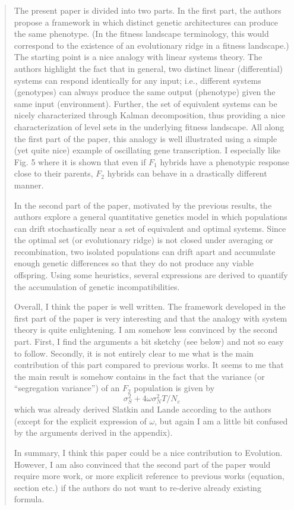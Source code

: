\begin{quote}
The present paper is divided into two parts. In the first part, the authors propose a framework
in which distinct genetic architectures can produce the same phenotype. (In the fitness landscape
terminology, this would correspond to the existence of an evolutionary ridge in a fitness landscape.)
The starting point is a nice analogy with linear systems theory. The authors highlight the fact
that in general, two distinct linear (differential) systems can respond identically for any input; i.e.,
different systems (genotypes) can always produce the same output (phenotype) given the same input
(environment). Further, the set of equivalent systems can be nicely characterized through Kalman
decomposition, thus providing a nice characterization of level sets in the underlying fitness landscape.
All along the first part of the paper, this analogy is well illustrated using a simple (yet quite nice)
example of oscillating gene transcription. I especially like Fig. 5 where it is shown that even if $F_1$
hybrids have a phenotypic response close to their parents, $F_2$ hybrids can behave in a drastically
different manner.

In the second part of the paper, motivated by the previous results, the authors explore a general
quantitative genetics model in which populations can drift stochastically near a set of equivalent
and optimal systems. Since the optimal set (or evolutionary ridge) is not closed under averaging or
recombination, two isolated populations can drift apart and accumulate enough genetic differences
so that they do not produce any viable offspring. Using some heuristics, several expressions are
derived to quantify the accumulation of genetic incompatibilities.

Overall, I think the paper is well written. The framework developed in the first part of the paper
is very interesting and that the analogy with system theory is quite enlightening. I am somehow
less convinced by the second part. First, I find the arguments a bit sketchy (see below) and not so
easy to follow. Secondly, it is not entirely clear to me what is the main contribution of this part
compared to previous works. It seems to me that the main result is somehow contains in the fact
that the variance (or ``segregation variance'') of an $F_2$ population is given by
$$\sigma^2_S + 4 \omega \sigma^2_N T / N_e$$
which was already derived Slatkin and Lande according to the authors (except for the explicit
expression of $\omega$, but again I am a little bit confused by the arguments derived in the appendix).

In summary, I think this paper could be a nice contribution to Evolution. However, I am also
convinced that the second part of the paper would require more work, or more explicit reference
to previous works (equation, section etc.) if the authors do not want to re-derive already existing
formula.
\end{quote}

